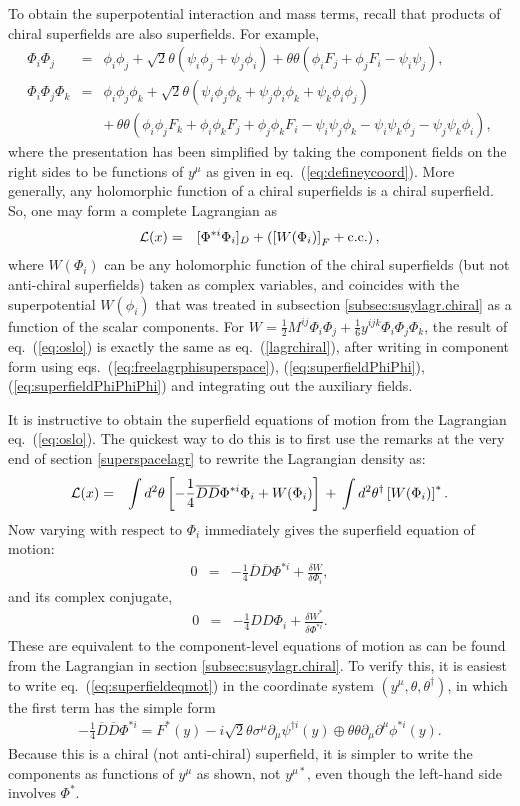 \documentclass[12pt]{article}
\def\BDminus{-}
\def\BDminus{+}
\def\BDminus{\ominus}
\def\BDminus{\oplus}
\def\beq{\begin{eqnarray}}
\def\eeq{\end{eqnarray}}
\def\Dcon{\overline D}
\begin{document}
To obtain the superpotential interaction and mass terms, recall that products of 
chiral superfields are also superfields. For example,
\beq
\Phi_i \Phi_j &=& \phi_i \phi_j 
+ \sqrt{2}\theta (\psi_i \phi_j + \psi_j \phi_i)
+ \theta\theta (\phi_i F_j + \phi_j F_i - \psi_i \psi_j)
,
\label{eq:superfieldPhiPhi}
\\
\Phi_i \Phi_j \Phi_k &=& \phi_i \phi_j \phi_k 
+ \sqrt{2}\theta (\psi_i \phi_j \phi_k 
+ \psi_j \phi_i \phi_k + \psi_k \phi_i \phi_j)
\nonumber 
\\ &&
+ \,\theta\theta (\phi_i \phi_j F_k + \phi_i \phi_k F_j + 
\phi_j \phi_k F_i 
- \psi_i \psi_j \phi_k - \psi_i \psi_k \phi_j
- \psi_j \psi_k \phi_i
),
\label{eq:superfieldPhiPhiPhi}
\eeq
where the presentation has been simplified by taking the component fields 
on the right sides to be functions of $y^\mu$ as given in 
eq.~(\ref{eq:defineycoord}). More generally, any holomorphic function of
a chiral superfields is a chiral superfield.
So, one may form a complete Lagrangian as
\beq
{\cal L}(x) &=& [\Phi^{*i} \Phi_i]_D + 
\left ( \left  [ W(\Phi_i) \right ]_F
+ {\rm c.c.} \right ),
\label{eq:oslo}
\eeq
where $W(\Phi_i)$ 
can be any holomorphic function 
of the chiral superfields (but not anti-chiral superfields) 
taken as complex variables, and
coincides with the superpotential $W(\phi_i)$ that was treated 
in subsection \ref{subsec:susylagr.chiral} as a function of the scalar components.
For $W = \frac{1}{2} M^{ij} \Phi_i \Phi_j
+ \frac{1}{6} y^{ijk} \Phi_i \Phi_j \Phi_k$, the result of 
eq.~(\ref{eq:oslo})
is exactly the same as eq.~(\ref{lagrchiral}), after writing in 
component form using eqs.~(\ref{eq:freelagrphisuperspace}), 
(\ref{eq:superfieldPhiPhi}), 
(\ref{eq:superfieldPhiPhiPhi}) and integrating out the auxiliary fields. 

It is instructive to obtain the superfield equations of motion
from the Lagrangian eq.~(\ref{eq:oslo}). The quickest way to do this
is to first use the remarks at the very end of section \ref{superspacelagr}
to rewrite the Lagrangian density as:
\beq
{\cal L}(x) &=& 
\int d^2\theta \left [ -\frac{1}{4} \Dcon\Dcon \Phi^{*i} \Phi_i  +
W(\Phi_i) \right ]
\,+ \,
\int d^2\theta^\dagger \left [W(\Phi_i)\right ]^*.
\eeq
Now varying with respect to $\Phi_i$ immediately gives the superfield equation of
motion:
\beq
0 &=& -\frac{1}{4} \Dcon\Dcon \Phi^{*i} + \frac{\delta W}{\delta \Phi_i} ,
\label{eq:superfieldeqmot}
\eeq
and its complex conjugate,
\beq
0&=& -\frac{1}{4} DD \Phi_i + \frac{\delta W^*}{\delta \Phi^{*i}} .
\label{eq:superfieldeqmotCON}
\eeq
These are equivalent to the component-level equations of motion as can be found from the
Lagrangian in section \ref{subsec:susylagr.chiral}. To verify this,
it is easiest to write eq.~(\ref{eq:superfieldeqmot})
in the coordinate system $(y^\mu, \theta, \theta^\dagger)$, 
in which the first term has the simple form
\beq
-\frac{1}{4} \Dcon\Dcon \Phi^{*i}
= F^*(y) - i \sqrt{2} \theta\sigma^\mu \partial_\mu \psi^{\dagger i}(y)
\BDminus \theta\theta \partial_\mu \partial^\mu \phi^{*i}(y) .
\eeq
Because this is a chiral (not anti-chiral) superfield, it is simpler to
write the components as functions of $y^\mu$ as shown, 
not $y^{\mu *}$, even though the left-hand 
side involves $\Phi^*$. 
\end{document}
